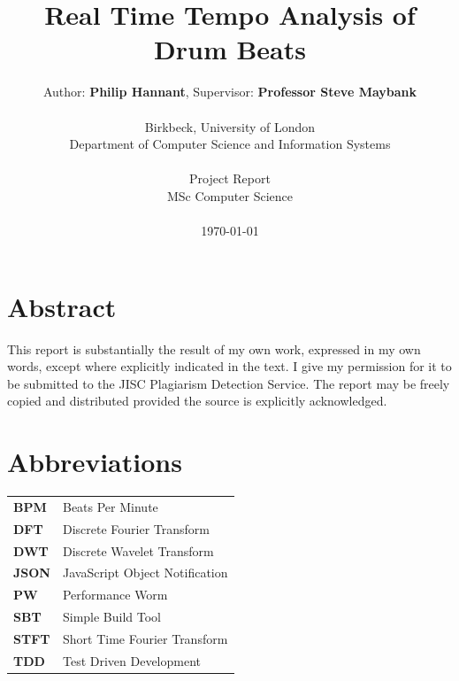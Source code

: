 \documentclass[a4paper, 11pt]{article}
\date{}
\begin{document}
 

\LARGE\title{Real Time Tempo Analysis of Drum Beats}

\LARGE\author{Author: \textbf{Philip Hannant}, Supervisor: \textbf{Professor Steve Maybank}\\
\\Birkbeck, University of London\\
Department of Computer Science and Information Systems\\
\\Project Report\\
MSc Computer Science\\
\\\monthyeardate\today
\vspace{20mm}
}

\normalsize


\maketitle
\section*{Abstract}



\begin{justify}
This report is substantially the result of my own work, expressed in my own words, except where explicitly indicated in the text. I give my permission for it to be submitted to the JISC Plagiarism Detection Service. The report may be freely copied and distributed provided the source is explicitly acknowledged.
\end{justify}


\maketitle
\newpage
\tableofcontents
\clearpage

\section*{Abbreviations}
\begin{tabular}{l p{4.5in}  }\\
\textbf{BPM} & Beats Per Minute\\
\textbf{DFT} & Discrete Fourier Transform\\
\textbf{DWT} & Discrete Wavelet Transform\\
\textbf{JSON} & JavaScript Object Notification\\
\textbf{PW} & Performance Worm\\
\textbf{SBT} & Simple Build Tool\\
\textbf{STFT} & Short Time Fourier Transform\\
\textbf{TDD} & Test Driven Development\\
\end{tabular}
\end{document}

